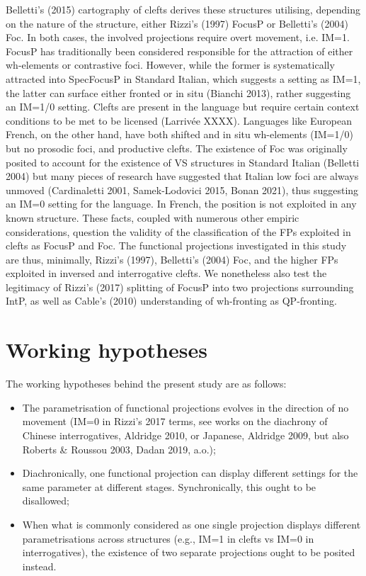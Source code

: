 \documentclass[fleqn,10pt]{wlscirep}
\begin{document}
Belletti’s (2015) cartography of clefts derives these structures utilising, depending on the nature of the structure, either Rizzi’s (1997) FocusP or Belletti’s (2004) Foc. In both cases, the involved projections require overt movement, i.e. IM=1.
FocusP has traditionally been considered responsible for the attraction of either wh-elements or contrastive foci. However, while the former is systematically attracted into SpecFocusP in Standard Italian, which suggests a setting as IM=1, the latter can surface either fronted or in situ (Bianchi 2013), rather suggesting an IM=1/0 setting. Clefts are present in the language but require certain context conditions to be met to be licensed (Larrivée XXXX). Languages like European French, on the other hand, have both shifted and in situ wh-elements (IM=1/0) but no prosodic foci, and productive clefts. The existence of Foc was originally posited to account for the existence of VS structures in Standard Italian (Belletti 2004) but many pieces of research have suggested that Italian low foci are always unmoved (Cardinaletti 2001, Samek-Lodovici 2015, Bonan 2021), thus suggesting an IM=0 setting for the language. In French, the position is not exploited in any known structure. These facts, coupled with numerous other empiric considerations, question the validity of the classification of the FPs exploited in clefts as FocusP and Foc. The functional projections investigated in this study are thus, minimally, Rizzi’s (1997), Belletti’s (2004) Foc, and the higher FPs exploited in inversed and interrogative clefts. We nonetheless also test the legitimacy of Rizzi’s (2017) splitting of FocusP into two projections surrounding IntP, as well as Cable’s (2010) understanding of wh-fronting as QP-fronting.

\section*{Working hypotheses}
The working hypotheses behind the present study are as follows:

\begin{itemize}
\item The parametrisation of functional projections evolves in the direction of no movement (IM=0 in Rizzi’s 2017 terms, see works on the diachrony of Chinese interrogatives, Aldridge 2010, or Japanese, Aldridge 2009, but also Roberts & Roussou 2003, Dadan 2019, a.o.);
\item Diachronically, one functional projection can display different settings for the same parameter at different stages. Synchronically, this ought to be disallowed;
\item When what is commonly considered as one single projection displays different parametrisations across structures (e.g., IM=1 in clefts vs IM=0 in interrogatives), the existence of two separate projections ought to be posited instead.
\end{itemize}
\end{document}

